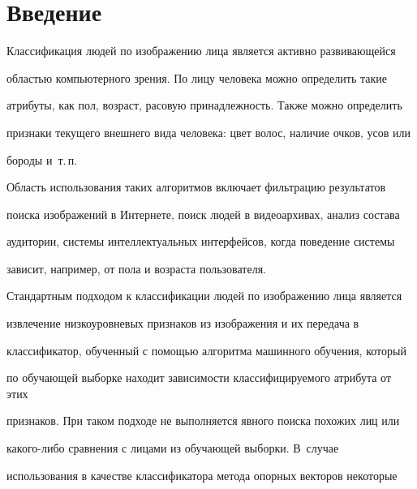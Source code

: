 




\section{Введение}





Классификация людей по изображению лица является активно развивающейся 


областью компьютерного зрения. По лицу человека можно определить такие 


атрибуты, как пол, возраст, расовую принадлежность. Также можно определить 


признаки текущего внешнего вида человека: цвет волос, наличие очков, усов или 


бороды и~т.\,п.





Область использования таких алгоритмов включает фильтрацию результатов 


поиска изображений в Интернете, поиск людей в видеоархивах, анализ состава\linebreak\vspace*{-12pt}





\noindent 


аудитории, системы интеллектуальных интерфейсов, когда поведение системы 


зависит, например, от пола и возраста пользователя. 





Стандартным подходом к классификации людей по изображению лица является 


извлечение низкоуровневых признаков из изображения и их передача в 


классификатор, обученный с помощью алгоритма машинного обучения, который 


по обучающей выборке находит зависимости классифицируемого атрибута от этих 


признаков. При таком подходе не выполняется явного поиска похожих лиц или 


ка\-ко\-го-ли\-бо сравнения с лицами из обучающей выборки. В~случае 


использования в качестве классификатора метода опорных векторов некоторые 


